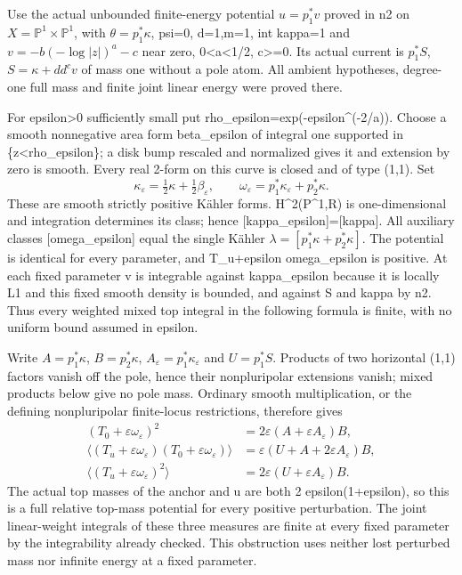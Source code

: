 \documentclass[
]{article}
\begin{document}
Use the actual unbounded finite-energy potential \(u=p_1^*v\) proved in
n2 on \(X=\mathbb{P}^1\times\mathbb{P}^1\), with \(\theta=p_1^*\kappa\),
psi=0, d=1,m=1, int kappa=1 and \(v=-b(-\log|z|)^a-c\) near zero,
0\textless a\textless1/2, c\textgreater=0. Its actual current is
\(p_1^*S\), \(S=\kappa+dd^c v\) of mass one without a pole atom. All
ambient hypotheses, degree-one full mass and finite joint linear energy
were proved there.

For epsilon\textgreater0 sufficiently small put
rho\_epsilon=exp(-epsilon\^{}(-2/a)). Choose a smooth nonnegative area
form beta\_epsilon of integral one supported in
\{\textbar z\textbar\textless rho\_epsilon\}; a disk bump rescaled and
normalized gives it and extension by zero is smooth. Every real 2-form
on this curve is closed and of type (1,1). Set \[
\kappa_\varepsilon=\tfrac12\kappa+\tfrac12\beta_\varepsilon,
\qquad \omega_\varepsilon=p_1^*\kappa_\varepsilon+p_2^*\kappa.
\] These are smooth strictly positive Kähler forms. H\^{}2(P\^{}1,R) is
one-dimensional and integration determines its class; hence
{[}kappa\_epsilon{]}={[}kappa{]}. All auxiliary classes
{[}omega\_epsilon{]} equal the single Kähler
\(\lambda=[p_1^*\kappa+p_2^*\kappa]\). The potential is identical for
every parameter, and T\_u+epsilon omega\_epsilon is positive. At each
fixed parameter v is integrable against kappa\_epsilon because it is
locally L1 and this fixed smooth density is bounded, and against S and
kappa by n2. Thus every weighted mixed top integral in the following
formula is finite, with no uniform bound assumed in epsilon.

Write \(A=p_1^*\kappa\), \(B=p_2^*\kappa\),
\(A_\varepsilon=p_1^*\kappa_\varepsilon\) and \(U=p_1^*S\). Products of
two horizontal (1,1) factors vanish off the pole, hence their
nonpluripolar extensions vanish; mixed products below give no pole mass.
Ordinary smooth multiplication, or the defining nonpluripolar
finite-locus restrictions, therefore gives \[
\begin{aligned}
(T_0+\varepsilon\omega_\varepsilon)^2&=2\varepsilon(A+\varepsilon A_\varepsilon)B,\\
\langle(T_u+\varepsilon\omega_\varepsilon)(T_0+\varepsilon\omega_\varepsilon)\rangle
&=\varepsilon(U+A+2\varepsilon A_\varepsilon)B,\\
\langle(T_u+\varepsilon\omega_\varepsilon)^2\rangle
&=2\varepsilon(U+\varepsilon A_\varepsilon)B.
\end{aligned}
\] The actual top masses of the anchor and u are both 2
epsilon(1+epsilon), so this is a full relative top-mass potential for
every positive perturbation. The joint linear-weight integrals of these
three measures are finite at every fixed parameter by the integrability
already checked. This obstruction uses neither lost perturbed mass nor
infinite energy at a fixed parameter.
\end{document}
